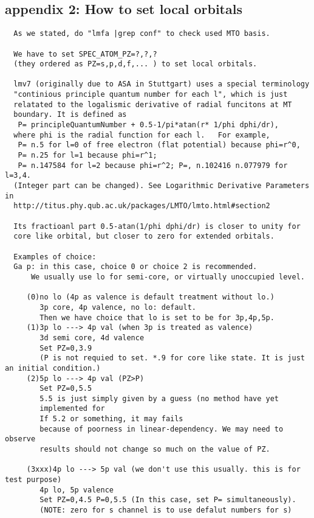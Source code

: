 \documentclass[a4paper,10pt,epsf,fleqn]{article}
\begin{document}
\subsection{appendix 2: How to set local orbitals}
\begin{verbatim}
  As we stated, do "lmfa |grep conf" to check used MTO basis. 

  We have to set SPEC_ATOM_PZ=?,?,? 
  (they ordered as PZ=s,p,d,f,... ) to set local orbitals.
  
  lmv7 (originally due to ASA in Stuttgart) uses a special terminology
  "continious principle quantum number for each l", which is just
  relatated to the logalismic derivative of radial funcitons at MT
  boundary. It is defined as
   P= principleQuantumNumber + 0.5-1/pi*atan(r* 1/phi dphi/dr),
  where phi is the radial function for each l.   For example, 
   P= n.5 for l=0 of free electron (flat potential) because phi=r^0,
   P= n.25 for l=1 because phi=r^1; 
   P= n.147584 for l=2 because phi=r^2; P=, n.102416 n.077979 for l=3,4.
  (Integer part can be changed). See Logarithmic Derivative Parameters in
  http://titus.phy.qub.ac.uk/packages/LMTO/lmto.html#section2

  Its fractioanl part 0.5-atan(1/phi dphi/dr) is closer to unity for
  core like orbital, but closer to zero for extended orbitals.

  Examples of choice:
  Ga p: in this case, choice 0 or choice 2 is recommended.
      We usually use lo for semi-core, or virtually unoccupied level.

     (0)no lo (4p as valence is default treatment without lo.)
        3p core, 4p valence, no lo: default.
        Then we have choice that lo is set to be for 3p,4p,5p.
     (1)3p lo ---> 4p val (when 3p is treated as valence)
        3d semi core, 4d valence  
        Set PZ=0,3.9 
        (P is not requied to set. *.9 for core like state. It is just an initial condition.)
     (2)5p lo ---> 4p val (PZ>P)
        Set PZ=0,5.5 
        5.5 is just simply given by a guess (no method have yet
		implemented for 
        If 5.2 or something, it may fails
        because of poorness in linear-dependency. We may need to observe
        results should not change so much on the value of PZ.

     (3xxx)4p lo ---> 5p val (we don't use this usually. this is for test purpose)
        4p lo, 5p valence 
        Set PZ=0,4.5 P=0,5.5 (In this case, set P= simultaneously).
        (NOTE: zero for s channel is to use defalut numbers for s)


\end{verbatim}
\end{document}
